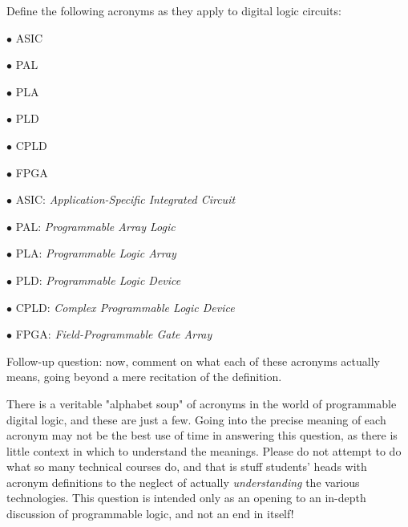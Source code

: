 

Define the following acronyms as they apply to digital logic circuits:

\medskip
\item{$\bullet$} ASIC
\item{$\bullet$} PAL
\item{$\bullet$} PLA
\item{$\bullet$} PLD
\item{$\bullet$} CPLD
\item{$\bullet$} FPGA
\medskip







\medskip
\item{$\bullet$} ASIC: {\it Application-Specific Integrated Circuit}
\item{$\bullet$} PAL: {\it Programmable Array Logic}
\item{$\bullet$} PLA: {\it Programmable Logic Array}
\item{$\bullet$} PLD: {\it Programmable Logic Device}
\item{$\bullet$} CPLD: {\it Complex Programmable Logic Device}
\item{$\bullet$} FPGA: {\it Field-Programmable Gate Array}
\medskip

\vskip 10pt

Follow-up question: now, comment on what each of these acronyms actually means, going beyond a mere recitation of the definition.







There is a veritable "alphabet soup" of acronyms in the world of programmable digital logic, and these are just a few.  Going into the precise meaning of each acronym may not be the best use of time in answering this question, as there is little context in which to understand the meanings.  Please do not attempt to do what so many technical courses do, and that is stuff students' heads with acronym definitions to the neglect of actually {\it understanding} the various technologies.  This question is intended only as an opening to an in-depth discussion of programmable logic, and not an end in itself!





